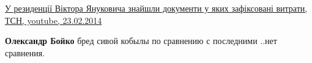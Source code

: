 \begin{itemize}
\href{https://youtu.be/qg2wymqd_7Y}{%
У резиденції Віктора Януковича знайшли документи у яких зафіксовані витрати, ТСН, %
youtube, 23.02.2014%
}

\begin{itemize}
 
\textbf{Олександр Бойко} бред сивой кобылы по сравнению с последними
..нет сравнения.
\end{itemize}


\end{itemize}

